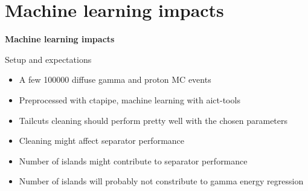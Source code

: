 
\section{Machine learning impacts}

\begin{frame}
    \centering
    {\Huge \textbf{Machine learning impacts}}
\end{frame}

\begin{frame}{Setup and expectations}
    \begin{itemize}
        \item A few \num{100000} diffuse gamma and proton MC events
        \item {Preprocessed with ctapipe, machine learning with
              aict-tools \\ {\footnotesize{\cite{aict}}}}
        \vspace{10pt}
        \item Tailcuts cleaning should perform pretty well with the chosen parameters
        \item Cleaning might affect separator performance
        \item Number of islands might contribute to separator performance
        \item Number of islands will probably not constribute to gamma energy regression
    \end{itemize}
\end{frame}

